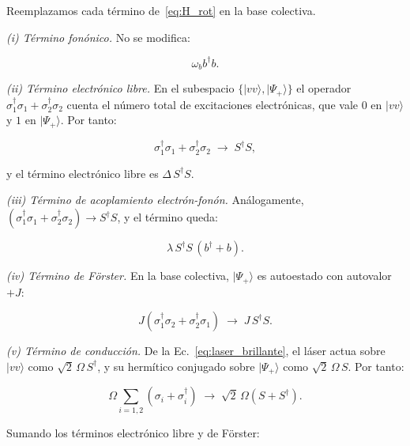 \documentclass[12pt]{article}
\begin{document}
	\medskip
	\noindent
	Reemplazamos cada t\'ermino de~\eqref{eq:H_rot} en la base colectiva.
	
	\medskip
	\noindent
	\textit{(i) T\'ermino fon\'onico.} No se modifica:
	
	\begin{equation}
		\omega_b b^\dagger b.
	\end{equation}
	
	\noindent
	\textit{(ii) T\'ermino electr\'onico libre.}
	En el subespacio $\{|vv\rangle, |\Psi_+\rangle\}$ el operador
	$\sigma_1^\dagger\sigma_1 + \sigma_2^\dagger\sigma_2$ cuenta el n\'umero total
	de excitaciones electr\'onicas, que vale $0$ en $|vv\rangle$ y $1$ en
	$|\Psi_+\rangle$. Por tanto:
	
	\begin{equation}
		\sigma_1^\dagger\sigma_1 + \sigma_2^\dagger\sigma_2
		\;\longrightarrow\; S^\dagger S,
	\end{equation}
	
	y el t\'ermino electr\'onico libre es $\Delta\, S^\dagger S$.
	
	\medskip
	\noindent
	\textit{(iii) T\'ermino de acoplamiento electr\'on-fon\'on.}
	An\'alogamente, $(\sigma_1^\dagger\sigma_1 + \sigma_2^\dagger\sigma_2)
	\to S^\dagger S$, y el t\'ermino queda:
	
	\begin{equation}
		\lambda\, S^\dagger S\,(b^\dagger + b).
	\end{equation}
	
	\noindent
	\textit{(iv) T\'ermino de F\"orster.}
	En la base colectiva, $|\Psi_+\rangle$ es autoestado con autovalor $+J$:
	
	\begin{equation}
		J\left(\sigma_1^\dagger\sigma_2 + \sigma_2^\dagger\sigma_1\right)
		\;\longrightarrow\; J\, S^\dagger S.
	\end{equation}
	
	\noindent
	\textit{(v) T\'ermino de conducci\'on.}
	De la Ec.~\eqref{eq:laser_brillante}, el l\'aser actua sobre $|vv\rangle$
	como $\sqrt{2}\,\Omega\,S^\dagger$, y su herm\'itico conjugado sobre
	$|\Psi_+\rangle$ como $\sqrt{2}\,\Omega\,S$. Por tanto:
	
	\begin{equation}
		\Omega\sum_{i=1,2}\left(\sigma_i + \sigma_i^\dagger\right)
		\;\longrightarrow\; \sqrt{2}\,\Omega\left(S + S^\dagger\right).
	\end{equation}
	
	\medskip
	\noindent
	Sumando los t\'erminos electr\'onico libre y de F\"orster:
	
\end{document}

